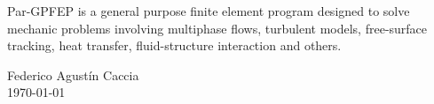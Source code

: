 \documentclass[11pt,a4paper,sans]{moderncv}        %
\begin{document}
{
{Par-GPFEP is a general purpose finite element program designed to solve mechanic problems involving multiphase flows, turbulent models, free-surface tracking, heat transfer, fluid-structure interaction and others.}



\vspace{\fill}
\hspace{0.7\linewidth}
\begin{minipage}{0.3\linewidth}
	\begin{center}
		Federico Agustín Caccia\\
		\today
		\bigskip
	\end{center}
\end{minipage}




}
\end{document}
